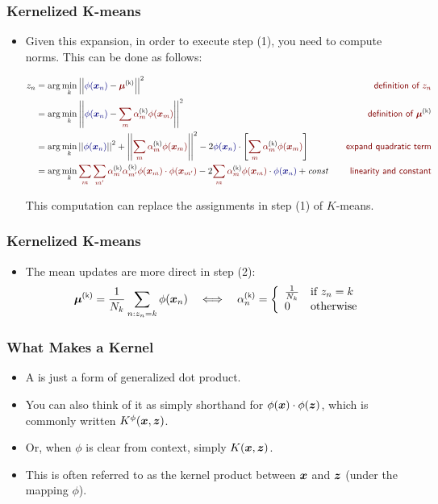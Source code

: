 \documentclass[trans]{beamer}
\begin{document}
\begin{frame}
  \frametitle{Kernelized K-means}
\begin{itemize}
\item 
Given this expansion, in order to execute step (1), you need to
compute norms.  This can be done as follows:
%
\begin{tiny}
\begin{align}
z_n 
&= \arg\min_k \norm{\textcolor{darkblue}{\phi(\vx_n)} - \textcolor{darkred}{\vec\mu\kth}}^2
   \becauseof{definition of $z_n$} \\
&= \arg\min_k \norm{\textcolor{darkblue}{\phi(\vx_n)} - \textcolor{darkred}{\sum_m \al\kth_m \phi(\vx_m)}}^2
   \becauseof{definition of $\vec\mu\kth$} \\
&= \arg\min_k \norm{\textcolor{darkblue}{\phi(\vx_n)}}^2+ \norm{\textcolor{darkred}{\sum_m \al\kth_m \phi(\vx_m)}}^2
   -2 \dotp{\textcolor{darkblue}{\phi(\vx_n)}}{\left[ \textcolor{darkred}{\sum_m \al\kth_m \phi(\vx_m)} \right]}
   \becauseof{expand quadratic term} \\
&= \arg\min_k \textcolor{darkred}{\sum_m \sum_{m'} \al\kth_m \al\kth_{m'} \dotp{\phi(\vx_m)}{\phi(\vx_{m'})}}
   -2 \textcolor{darkred}{\sum_m \al\kth_m} \dotp{\textcolor{darkred}{\phi(\vx_m)}}{\textcolor{darkblue}{\phi(\vx_n)}}
   + \textit{const}
   \becauseof{linearity and constant}
\end{align}
\end{tiny}
%
This computation can replace the assignments in step (1) of
$K$-means. 
\end{itemize}
\end{frame}
\begin{frame}
  \frametitle{Kernelized K-means}
\begin{itemize}
\item 
 The mean updates are more direct in step (2):
%
\begin{align}
\vec\mu\kth = \frac 1 {N_k} \sum_{n : z_n=k} \phi(\vx_n)
\quad\Longleftrightarrow\quad
\al\kth_n = \brack{\frac 1 {N_k} & \text{if } z_n = k \\ 0 & \text{otherwise}}
\end{align}
\end{itemize}
\end{frame}

\begin{frame}
  \frametitle{What Makes a Kernel}
\begin{itemize}
\item 
A  is just a form of generalized dot product.
\item  You can
also think of it as simply shorthand for
$\phi({\boldsymbol{x}}) \cdot \phi({\boldsymbol{z}})$, which is commonly written
$K^\phi({\boldsymbol{x}},{\boldsymbol{z}})$.
\item  Or, when $\phi$ is clear from context, simply
$K({\boldsymbol{x}},{\boldsymbol{z}})$.
\item   This is often referred to as the kernel product between
${\boldsymbol{x}}$ and ${\boldsymbol{z}}$ (under the mapping $\phi$).
\end{itemize}
\end{frame}
\end{document}
